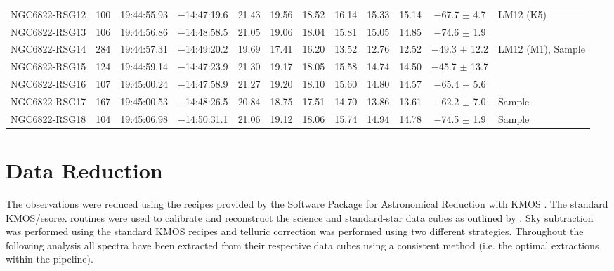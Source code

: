 \documentclass[iop]{emulateapj}
\begin{document}
\begin{table*}
\begin{center}
\begin{tabular}{lrcccccccccl}
NGC6822-RSG12 & 100 &   19:44:55.93  &  $-$14:47:19.6  &  21.43  &  19.56  &  18.52  &  16.14  &  15.33  &  15.14  & $-$67.7 $\pm$ 4.7 & LM12 (K5) \\
NGC6822-RSG13 & 106 &   19:44:56.86  &  $-$14:48:58.5  &  21.05  &  19.06  &  18.04  &  15.81  &  15.05  &  14.85  & $-$74.6 $\pm$ 1.9 \\
NGC6822-RSG14 & 284 &   19:44:57.31  &  $-$14:49:20.2  &  19.69  &  17.41  &  16.20  &  13.52  &  12.76  &  12.52  & $-$49.3 $\pm$ 12.2 & LM12 (M1), Sample \\
NGC6822-RSG15 & 124 &   19:44:59.14  &  $-$14:47:23.9  &  21.30  &  19.17  &  18.05  &  15.58  &  14.74  &  14.50  & $-$45.7 $\pm$ 13.7 \\
NGC6822-RSG16 & 107 &   19:45:00.24  &  $-$14:47:58.9  &  21.27  &  19.20  &  18.10  &  15.60  &  14.80  &  14.57  & $-$65.4 $\pm$ 5.6 \\
NGC6822-RSG17 & 167 &   19:45:00.53  &  $-$14:48:26.5  &  20.84  &  18.75  &  17.51  &  14.70  &  13.86  &  13.61  & $-$62.2 $\pm$ 7.0 & Sample\\
NGC6822-RSG18 & 104 &   19:45:06.98  &  $-$14:50:31.1  &  21.06  &  19.12  &  18.06  &  15.74  &  14.94  &  14.78  & $-$74.5 $\pm$ 1.9 & Sample\\

\hline
\end{tabular}
\end{center}
\end{table*}



\section{Data Reduction} %
\label{sec:data_reduction}

The observations were reduced using the recipes provided by the Software Package for Astronomical Reduction with KMOS
\citep[SPARK;][]{2013A&A...558A..56D}.
The standard KMOS/esorex routines were used to calibrate and reconstruct the science and standard-star data cubes as outlined by
\cite{2013A&A...558A..56D}.
Sky subtraction was performed using the standard KMOS recipes and telluric correction was performed using two different strategies.
Throughout the following analysis all spectra have been extracted from their respective data cubes using a consistent method (i.e. the optimal extractions within the pipeline).
\end{document}

